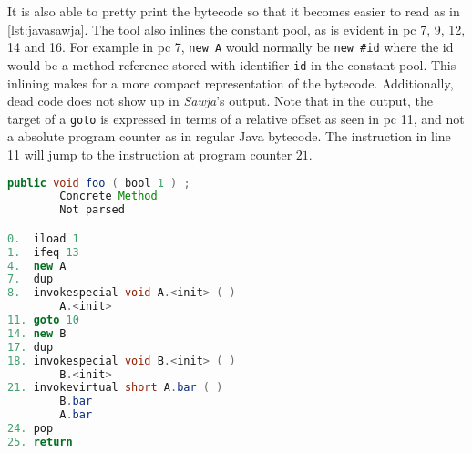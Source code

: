 \noindent It is also able to pretty print the bytecode so that it becomes easier to read as in \cref{lst:javasawja}. 
The tool also inlines the constant pool, as is evident in pc 7, 9, 12, 14 and 16. For example in pc 7, \texttt{new A} would normally be \texttt{new \#id} where the id would be a method reference stored with identifier \texttt{id} in the constant pool. This inlining makes for a more compact representation of the bytecode. Additionally, dead code does not show up in \textit{Sawja}'s output.
Note that in the output, the target of a \texttt{goto} is expressed in terms of a relative offset as seen in pc 11, and not a absolute program counter as in regular Java bytecode. The instruction in line 11 will jump to the instruction at program counter $21$.


\begin{lstlisting}[caption=Sawja sample. Note that the numbers on the inner left side are program counter values.,numbers=none,language=Java,label=lst:javasawja]
public void foo ( bool 1 ) ;
		Concrete Method
    	Not parsed

0.  iload 1
1.  ifeq 13
4.  new A
7.  dup
8.  invokespecial void A.<init> ( )
        A.<init>
11. goto 10
14. new B
17. dup
18. invokespecial void B.<init> ( )
        B.<init>
21. invokevirtual short A.bar ( )
        B.bar
        A.bar
24. pop
25. return

\end{lstlisting}

